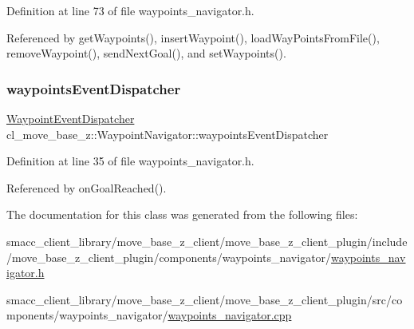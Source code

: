 Definition at line 73 of file waypoints\+\_\+navigator.\+h.



Referenced by get\+Waypoints(), insert\+Waypoint(), load\+Way\+Points\+From\+File(), remove\+Waypoint(), send\+Next\+Goal(), and set\+Waypoints().

\mbox{\label{classcl__move__base__z_1_1WaypointNavigator_a4f2be7a9741e8535c414e63335d752a0}} 
\subsubsection{\texorpdfstring{waypoints\+Event\+Dispatcher}{waypointsEventDispatcher}}
{\footnotesize\ttfamily \hyperlink{classcl__move__base__z_1_1WaypointEventDispatcher}{Waypoint\+Event\+Dispatcher} cl\+\_\+move\+\_\+base\+\_\+z\+::\+Waypoint\+Navigator\+::waypoints\+Event\+Dispatcher}



Definition at line 35 of file waypoints\+\_\+navigator.\+h.



Referenced by on\+Goal\+Reached().



The documentation for this class was generated from the following files\+:\begin{DoxyCompactItemize}
\item 
smacc\+\_\+client\+\_\+library/move\+\_\+base\+\_\+z\+\_\+client/move\+\_\+base\+\_\+z\+\_\+client\+\_\+plugin/include/move\+\_\+base\+\_\+z\+\_\+client\+\_\+plugin/components/waypoints\+\_\+navigator/\hyperlink{waypoints__navigator_8h}{waypoints\+\_\+navigator.\+h}\item 
smacc\+\_\+client\+\_\+library/move\+\_\+base\+\_\+z\+\_\+client/move\+\_\+base\+\_\+z\+\_\+client\+\_\+plugin/src/components/waypoints\+\_\+navigator/\hyperlink{waypoints__navigator_8cpp}{waypoints\+\_\+navigator.\+cpp}\end{DoxyCompactItemize}
